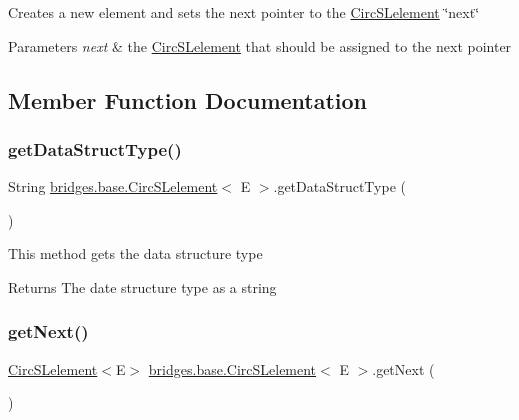 Creates a new element and sets the next pointer to the \hyperlink{classbridges_1_1base_1_1_circ_s_lelement}{Circ\+S\+Lelement} \char`\"{}next\char`\"{}


\begin{DoxyParams}{Parameters}
{\em next} & the \hyperlink{classbridges_1_1base_1_1_circ_s_lelement}{Circ\+S\+Lelement} that should be assigned to the next pointer \\
\hline
\end{DoxyParams}


\subsection{Member Function Documentation}
\hypertarget{classbridges_1_1base_1_1_circ_s_lelement_ad56acddc52e8e0b6869a6f24f1e0a90e}{}\label{classbridges_1_1base_1_1_circ_s_lelement_ad56acddc52e8e0b6869a6f24f1e0a90e} 
\subsubsection{\texorpdfstring{get\+Data\+Struct\+Type()}{getDataStructType()}}
{\footnotesize\ttfamily String \hyperlink{classbridges_1_1base_1_1_circ_s_lelement}{bridges.\+base.\+Circ\+S\+Lelement}$<$ E $>$.get\+Data\+Struct\+Type (\begin{DoxyParamCaption}{ }\end{DoxyParamCaption})}

This method gets the data structure type

\begin{DoxyReturn}{Returns}
The date structure type as a string 
\end{DoxyReturn}
\hypertarget{classbridges_1_1base_1_1_circ_s_lelement_ae18b07e3f1d37b5eca0cae22efc0d395}{}\label{classbridges_1_1base_1_1_circ_s_lelement_ae18b07e3f1d37b5eca0cae22efc0d395} 
\subsubsection{\texorpdfstring{get\+Next()}{getNext()}}
{\footnotesize\ttfamily \hyperlink{classbridges_1_1base_1_1_circ_s_lelement}{Circ\+S\+Lelement}$<$E$>$ \hyperlink{classbridges_1_1base_1_1_circ_s_lelement}{bridges.\+base.\+Circ\+S\+Lelement}$<$ E $>$.get\+Next (\begin{DoxyParamCaption}{ }\end{DoxyParamCaption})}

